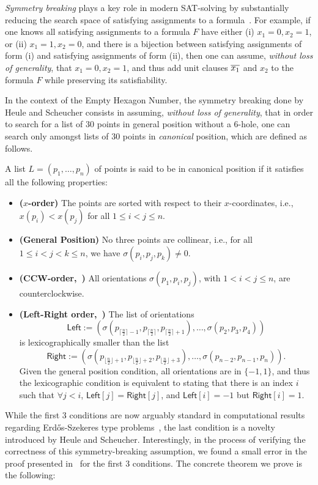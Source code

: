 \emph{Symmetry breaking} plays a key role in modern SAT-solving by substantially reducing the search space of satisfying assignments to a formula~\cite{biereHandbookSatisfiabilityVolume2009}. For example, if one knows all satisfying assignments to a formula $F$ have either (i) $x_1 = 0, x_2 = 1$, or  (ii) $x_1 = 1, x_2 = 0$, and there is a bijection between satisfying assignments of form (i) and satisfying assignments of form (ii), then one can assume, \emph{without loss of generality}, that $x_1 = 0, x_2 = 1$, and thus add unit clauses $\overline{x_1}$ and $x_2$ to the formula $F$ while preserving its satisfiability.

In the context of the Empty Hexagon Number, the symmetry breaking done by Heule and Scheucher consists in assuming, \emph{without loss of generality}, that in order to search for a list of $30$ points in general position without a $6$-hole, one can search only amongst lists of $30$ points in \emph{canonical} position, which are defined as follows.
\begin{definition}
A list $L = (p_1,\ldots, p_{n})$ of points is said to be in canonical position if it satisfies all the following properties:
\begin{itemize}
    \item \textbf{($x$-order)} The points are sorted with respect to their $x$-coordinates, i.e., $x(p_i) < x(p_j)$ for all $1 \leq i < j \leq n$.
    \item \textbf{(General Position)} No three points are collinear, i.e., for all $1 \leq i < j < k \leq n$, we have $\sigma(p_i, p_j, p_k) \neq 0$.
    \item \textbf{(CCW-order,~)} All orientations $\sigma(p_1, p_i, p_j)$, with $1 < i < j \leq n$, are counterclockwise.
    \item \textbf{(Left-Right order,~)} The list of orientations \[\textsf{Left} := \left(\sigma\left(p_{\lceil \frac{n}{2} \rceil -1}, p_{\lceil \frac{n}{2} \rceil},p_{\lceil \frac{n}{2} \rceil+1}\right), \ldots, \sigma\left(p_2, p_3, p_4\right) \right)\] is lexicographically smaller than the list \[ \textsf{Right} := \left(\sigma\left(p_{\lfloor \frac{n}{2} \rfloor  + 1}, p_{\lfloor \frac{n}{2} \rfloor+2},p_{\lfloor \frac{n}{2} \rfloor+3}\right), \ldots, \sigma\left(p_{n-2}, p_{n-1}, p_{n}\right) \right).\] Given the general position condition, all orientations are in $\{-1, 1\}$, and thus the lexicographic condition is equivalent to stating that there is an index $i$ such that $\forall j < i$, $\textsf{Left}[j] = \textsf{Right}[j]$, and $\textsf{Left}[i] = -1$ but $\textsf{Right}[i] = 1$.
\end{itemize}
\end{definition}
    While the first 3 conditions are now arguably standard in computational results regarding Erd\H{o}s-Szekeres type problems~\cite{scheucherTwoDisjoint5holes2020}, the last condition is a novelty introduced by Heule and Scheucher.
    Interestingly, in the process of verifying the correctness of this symmetry-breaking assumption, we found a small error in the proof presented in~\cite{scheucherTwoDisjoint5holes2020} for the first $3$ conditions.
The concrete theorem we prove is the following:

